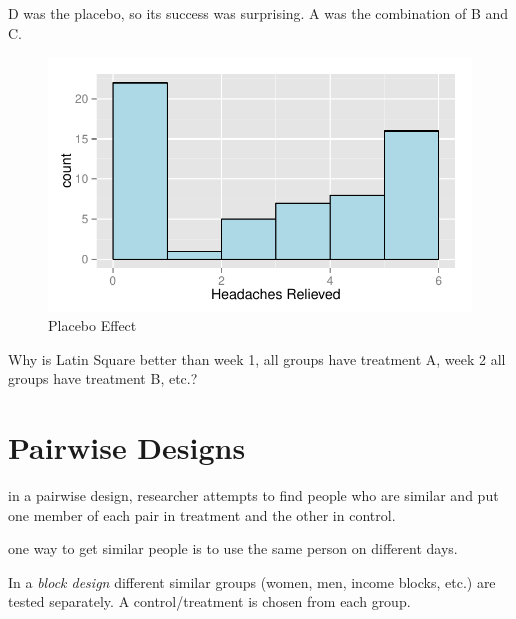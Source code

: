 \documentclass[landscape]{exam}
\begin{document}
  D was the placebo, so its success was surprising.  A was the combination of B
  and C.

  \begin{figure}[H]
    \centering
    \includegraphics[scale = 0.8]{figures/placebo.pdf}
    \caption{Placebo Effect}
    \label{fig:placebo}
  \end{figure}

  Why is Latin Square better than week 1, all groups have treatment A, week 2
  all groups have treatment B, etc.?


  \section{Pairwise Designs}

  \begin{itemize*}
    \item in a pairwise design, researcher attempts to find people who are
      similar and put one member of each pair in treatment and the other in
      control.

    \item one way to get similar people is to use the same person on different
      days.

    \item In a {\em block design} different similar groups (women, men, income
      blocks, etc.) are tested separately.  A control/treatment is chosen from
      each group.  
  \end{itemize*}
\end{document}

